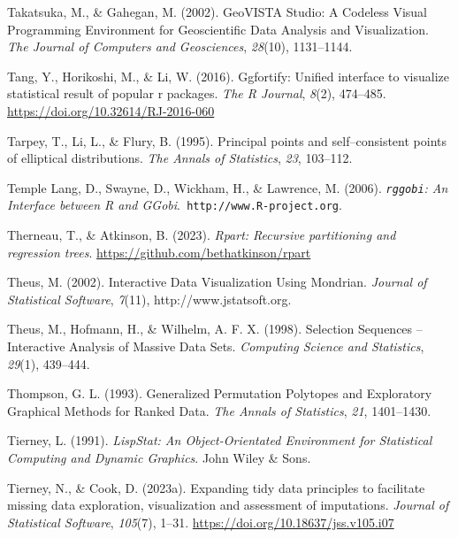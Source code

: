 \documentclass[
  letterpaper,
]{krantz}
\newlength{\cslhangindent}
\newenvironment{CSLReferences}[2] %
 {\begin{list}{}{%
  \setlength{\itemindent}{0pt}
  \setlength{\leftmargin}{0pt}
  \setlength{\parsep}{0pt}
  \ifodd #1
   \setlength{\leftmargin}{\cslhangindent}
   \setlength{\itemindent}{-1\cslhangindent}
  \fi
  \setlength{\itemsep}{#2\baselineskip}}}
 {\end{list}}
\begin{document}
\begin{CSLReferences}{1}{0}
Takatsuka, M., \& Gahegan, M. (2002). {GeoVISTA Studio}: A {C}odeless
{V}isual {P}rogramming {E}nvironment for {G}eoscientific {D}ata
{A}nalysis and {V}isualization. \emph{The Journal of Computers and
Geosciences}, \emph{28}(10), 1131--1144.

Tang, Y., Horikoshi, M., \& Li, W. (2016). Ggfortify: Unified interface
to visualize statistical result of popular r packages. \emph{The R
Journal}, \emph{8}(2), 474--485.
\url{https://doi.org/10.32614/RJ-2016-060}

Tarpey, T., Li, L., \& Flury, B. (1995). Principal points and
self--consistent points of elliptical distributions. \emph{The Annals of
Statistics}, \emph{23}, 103--112.

Temple Lang, D., Swayne, D., Wickham, H., \& Lawrence, M. (2006).
\emph{{\texttt{rggobi}}: {A}n {I}nterface between {R} and
{GG}obi}.{\texttt{\ http://www.R-project.org}}.

Therneau, T., \& Atkinson, B. (2023). \emph{Rpart: Recursive
partitioning and regression trees}.
\url{https://github.com/bethatkinson/rpart}

Theus, M. (2002). Interactive {D}ata {V}isualization {U}sing {M}ondrian.
\emph{Journal of Statistical Software}, \emph{7}(11),
http://www.jstatsoft.org.

Theus, M., Hofmann, H., \& Wilhelm, A. F. X. (1998). Selection
{S}equences -- {I}nteractive {A}nalysis of {M}assive {D}ata {S}ets.
\emph{Computing Science and Statistics}, \emph{29}(1), 439--444.

Thompson, G. L. (1993). Generalized {P}ermutation {P}olytopes and
{E}xploratory {G}raphical {M}ethods for {R}anked {D}ata. \emph{The
Annals of Statistics}, \emph{21}, 1401--1430.

Tierney, L. (1991). \emph{{L}isp{S}tat: {A}n {O}bject-{O}rientated
{E}nvironment for {S}tatistical {C}omputing and {D}ynamic {G}raphics}.
John Wiley \& Sons.

Tierney, N., \& Cook, D. (2023a). Expanding tidy data principles to
facilitate missing data exploration, visualization and assessment of
imputations. \emph{Journal of Statistical Software}, \emph{105}(7),
1--31. \url{https://doi.org/10.18637/jss.v105.i07}


\end{CSLReferences}
\end{document}
